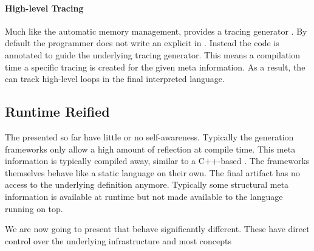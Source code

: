 \paragraph{High-level Tracing \JIT}
Much like the automatic memory management, \PyPy provides a tracing \JIT generator \cite{Bolz09a}.
By default the \VM programmer does not write an explicit \JIT in \PyPy.
Instead the \VM code is annotated to guide the underlying tracing \JIT generator.
This means a \VM compilation time a specific tracing \JIT is created for the given meta information.
As a result, the \JIT can track high-level loops in the final interpreted language.



\subsection{Runtime Reified \VMs}

The \VMs presented so far have little or no self-awareness.
Typically the \VM generation frameworks only allow a high amount of reflection at \VM compile time.
This meta information is typically compiled away, similar to a C++-based \VM.
The \VM frameworks themselves behave like a static language on their own.
The final \VM artifact has no access to the underlying definition anymore.
Typically some structural meta information is available at runtime but not made available to the language running on top.

We are now going to present \VMs that behave significantly different.
These \VMs have direct control over the underlying infrastructure and most concepts
\\
 \\
\\


\subsubsection*{\Pinocchio \VM}

